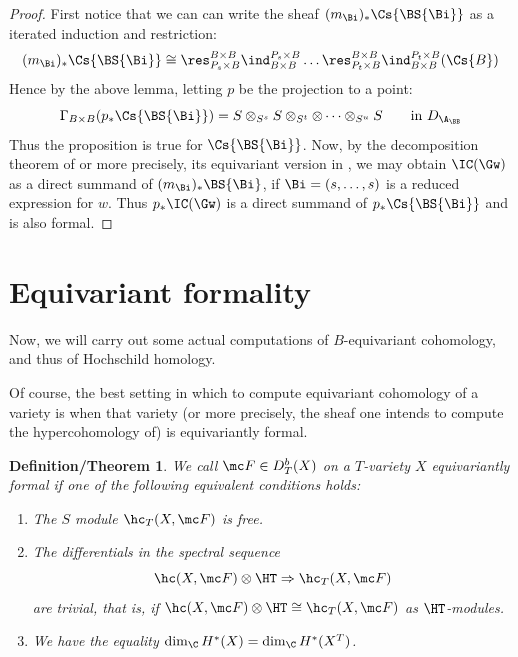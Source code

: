 \documentclass[12pt]{wart}
\newtheorem{deth}[thm]{Definition/Theorem}
\theoremstyle{remark}
\begin{document}
\begin{proof}
First notice that we
can can write the sheaf  $(m_{\Bi})_*\Cs{\BS{\Bi}}$ as a iterated induction and
restriction:
\begin{equation*}
(m_{\Bi})_*\Cs{\BS{\Bi}}\cong \res_{P_{s} \times B}^{B \times B}\ind_{B \times B}^{P_{s} \times B} \dots 
\res_{P_{t} \times B}^{B \times B}\ind_{B \times B}^{P_{t} \times B}(\Cs{B})
\end{equation*}
Hence by the above lemma, letting $p$ be the projection to a point:
\begin{equation*}
\Gamma_{B \times B} (p_*\Cs{\BS{\Bi}}) = S\otimes_{S^{s}} S \otimes_{S^{t}} \otimes \dots \otimes_{S^{u}} S \qquad \text{in $D_{\A_{\BB}}$}%
\end{equation*}
Thus the proposition is true for $\Cs{\BS{\Bi}}$. Now, by the decomposition theorem of \cite{BBD} or more precisely, its equivariant version in \cite{BL},
  we may obtain $\IC(\Gw)$ as a direct summand of $(m_{\Bi})_*\BS{\Bi}$, if $\Bi  = (s, \dots, s)$ is a reduced expression for $w$. Thus $p_*\IC(\Gw)$ is a direct summand of $p_*\Cs{\BS{\Bi}}$ and is also formal.
\end{proof}

\section{Equivariant formality}
\label{sec:equiv-form}

Now, we will carry out some actual computations of $B$-equivariant
cohomology, and thus of Hochschild homology.


Of course, the best setting in which to compute equivariant cohomology
of a variety is when that variety (or more precisely, the sheaf one
intends to compute the hypercohomology of) is equivariantly formal.

\begin{deth}\label{eq-for-def}
  We call $\mc F\in D^b_T(X)$ on a $T$-variety $X$ equivariantly formal if one of the following equivalent conditions holds:
  \begin{enumerate}
  \item The $S$ module $\hc_T(X,\mc F)$ is free.
  \item The differentials in the spectral sequence
    \begin{equation*}
      \hc(X,\mc F)\otimes\HT\Rightarrow\hc_{T}(X,\mc F)
    \end{equation*}
    are trivial, that is, if $\hc(X,\mc F)\otimes\HT\cong\hc_{T}(X,\mc
    F)$ as $\HT$-modules.
  \item We have the equality $\dim_\C H^*(X)= \dim_{\C}H^*(X^T)$.
  \end{enumerate}
\end{deth}
\end{document}
